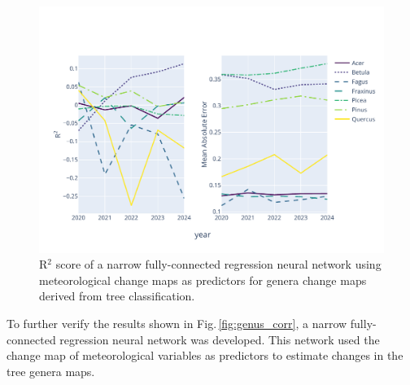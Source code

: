 \begin{figure}[ht]
    \centering
    \includegraphics[width=0.9\linewidth, trim={10pt 20pt 10pt 40pt}, clip]{figures/figures_climate/regression_results.pdf}
    \caption{R$^2$ score of a narrow fully-connected regression neural network using meteorological change maps as predictors for genera change maps derived from tree classification.}
    \label{fig:regression_results}
\end{figure}

To further verify the results shown in Fig.\,\ref{fig:genus_corr}, a narrow fully-connected regression neural network was developed. This network used the change map of meteorological variables as predictors to estimate changes in the tree genera maps.
